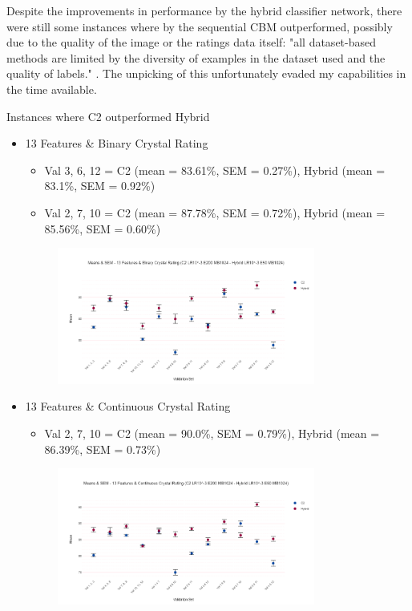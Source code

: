 Despite the improvements in performance by the hybrid classifier network, there were still some instances where by the sequential CBM outperformed, possibly due to the quality of the image or the ratings data itself: "all dataset-based methods are limited by the diversity of examples in the dataset used and the quality of labels." \cite{raukerTransparentAISurvey2023}. The unpicking of this unfortunately evaded my capabilities in the time available.

Instances where C2 outperformed Hybrid
\begin{itemize}
    \item 13 Features \& Binary Crystal Rating 
        \begin{itemize}
        \item Val 3, 6, 12 = C2 (mean = 83.61\%, SEM = 0.27\%), Hybrid (mean = 83.1\%, SEM = 0.92\%)
        \item Val 2, 7, 10 = C2 (mean = 87.78\%, SEM = 0.72\%), Hybrid (mean = 85.56\%, SEM = 0.60\%)
        \end{itemize}
            \begin{figure}[H]
            \centering
            \includegraphics[width=0.8\textwidth]{images/Means & SEM - 13 Features & Binary Crystal Rating (C2 LR10^-3 E200 MB1024 - Hybrid LR10^-3 E50 MB1024).png}
            \end{figure}
        \vspace{0.5cm}
    \item 13 Features \& Continuous Crystal Rating
        \begin{itemize}
        \item Val 2, 7, 10 = C2 (mean = 90.0\%, SEM = 0.79\%), Hybrid (mean = 86.39\%, SEM = 0.73\%)
        \end{itemize}
            \begin{figure}[H]
            \centering
            \includegraphics[width=0.8\textwidth]{images/Means & SEM - 13 Features & Continuous Crystal Rating (C2 LR10^-3 E200 MB1024 - Hybrid LR10^-3 E50 MB1024).png}

\end{figure}
\end{itemize}
